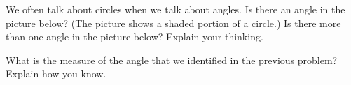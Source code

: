 \documentclass[nooutcomes,noauthor]{ximera}
\begin{document}
\newpage

\begin{problem}
We often talk about circles when we talk about angles. Is there an angle in the picture below? (The picture shows a shaded portion of a circle.) Is there more than one angle in the picture below? Explain your thinking.
\begin{image}  \end{image}
\end{problem}

\begin{problem}
What is the measure of the angle that we identified in the previous problem? Explain how you know.
\begin{image}  \end{image}
\end{problem}

\newpage
\end{document}
